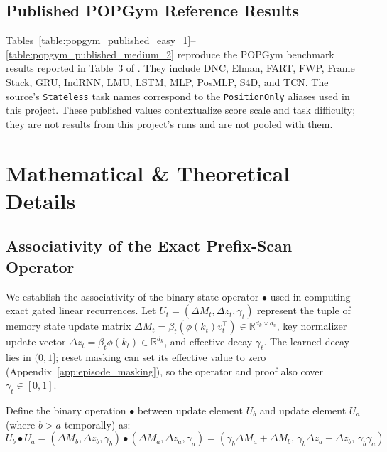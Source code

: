 \subsection{Published POPGym Reference Results}
Tables~\ref{table:popgym_published_easy_1}--\ref{table:popgym_published_medium_2} reproduce the POPGym benchmark results reported in Table~3 of \citet{morad2023popgym}. They include DNC, Elman, FART, FWP, Frame Stack, GRU, IndRNN, LMU, LSTM, MLP, PosMLP, S4D, and TCN. The source's \texttt{Stateless} task names correspond to the \texttt{PositionOnly} aliases used in this project. These published values contextualize score scale and task difficulty; they are not results from this project's runs and are not pooled with them.







\clearpage

\section{Mathematical \& Theoretical Details}
\label{app:math_details}

\subsection{Associativity of the Exact Prefix-Scan Operator}
We establish the associativity of the binary state operator $\bullet$ used in computing exact gated linear recurrences. Let $U_t = (\Delta M_t, \Delta z_t, \gamma_t)$ represent the tuple of memory state update matrix $\Delta M_t = \beta_t (\phi(k_t) v_t^\top) \in \mathbb{R}^{d_k \times d_v}$, key normalizer update vector $\Delta z_t = \beta_t \phi(k_t) \in \mathbb{R}^{d_k}$, and effective decay $\gamma_t$. The learned decay lies in $(0,1]$; reset masking can set its effective value to zero (Appendix~\ref{app:episode_masking}), so the operator and proof also cover $\gamma_t\in[0,1]$.

Define the binary operation $\bullet$ between update element $U_b$ and update element $U_a$ (where $b > a$ temporally) as:
\begin{equation}
    U_b \bullet U_a = (\Delta M_b, \Delta z_b, \gamma_b) \bullet (\Delta M_a, \Delta z_a, \gamma_a) = \left( \gamma_b \Delta M_a + \Delta M_b, \, \gamma_b \Delta z_a + \Delta z_b, \, \gamma_b \gamma_a \right)
\end{equation}

